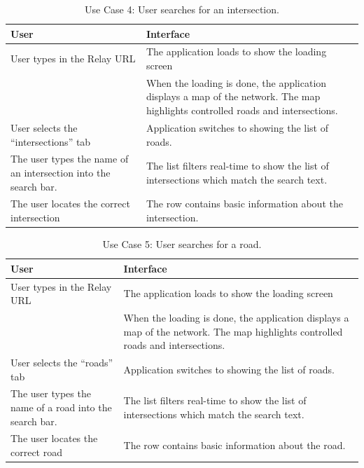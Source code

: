 \documentclass{report}
\begin{document}
\begin{table}[htbp]
\begin{centering}
    \begin{tabular}{| p{7cm} | p{7cm} |}
    \hline
    User    & Interface   \\ \hline
    User types in the Relay URL    &     The application loads to show the loading screen    \\ \hline
    ~      & When the loading is done, the application displays a map of the network. The map highlights controlled roads and intersections. \\ \hline
     User selects the ``intersections'' tab  &    Application switches to showing the list of roads.          \\ \hline
    The user types the name of an intersection into the search bar.   &   The list filters real-time to show the list of intersections which match the search text.   \\ \hline
    The user locates the correct intersection     &     The row contains basic information about the intersection. \\ \hline
    \end{tabular}
    \caption {Use Case 4: User searches for an intersection.}
    \label{use-case-4}
   \end{centering}
\end{table}

\begin{table}[htbp]
\begin{centering}
    \begin{tabular}{| p{7cm} | p{7cm} |}
    \hline
    User    & Interface   \\ \hline
    User types in the Relay URL    &     The application loads to show the loading screen    \\ \hline
    ~      & When the loading is done, the application displays a map of the network. The map highlights controlled roads and intersections. \\ \hline
     User selects the ``roads'' tab  &    Application switches to showing the list of roads.          \\ \hline
    The user types the name of a road into the search bar.   &   The list filters real-time to show the list of intersections which match the search text.   \\ \hline
    The user locates the correct road     &     The row contains basic information about the road. \\ \hline
    \end{tabular}
    \caption {Use Case 5: User searches for a road.}
    \label{use-case-5}
   \end{centering}
\end{table}
\end{document}
